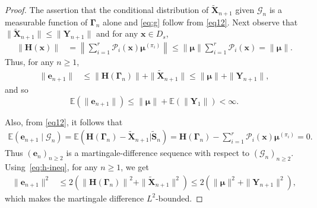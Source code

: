 \documentclass[10pt,a4paper]{amsart}
\begin{document}
\begin{proof} 
{%
The assertion that the conditional distribution of $\boldsymbol{\widetilde{X}}_{n+1}$ given $\mathcal{G}_{n}$ is a measurable function of $\boldsymbol{\Gamma}_{n}$ alone and \eqref{eq:g} follow from \eqref{eq12}. Next observe that $\|\boldsymbol{\widetilde{X}}_{n+1}\| \leq \|\boldsymbol{Y}_{n+1}\|$ and for any $\boldsymbol{x} \in {D}_s$,
\begin{align}\label{eq:h-ineq}
    \|\boldsymbol{H}(\boldsymbol{x})\| &= \left\|\sum_{i=1}^{r}\mathcal{P}_i(\boldsymbol{x})\boldsymbol{\mu}^{(\pi_i)}\right\| \leq \|\boldsymbol{\mu}\| \sum_{i=1}^{r} \mathcal{P}_i(\boldsymbol{x}) = \|\boldsymbol{\mu}\|. 
\end{align}
Thus, for any $n \geq 1$,
\begin{align}\label{eq:e-bound}
    \|\boldsymbol{e}_{n+1}\| &\leq \left\|\boldsymbol{H}\left({\boldsymbol{\Gamma}_n}\right)\right\| + \|\boldsymbol{\widetilde{X}}_{n+1}\| \leq \|\boldsymbol{\mu}\| + \|\boldsymbol{Y}_{n+1}\|,
\end{align}
and so
\[\mathbb{E}\left(\|\boldsymbol{e}_{n+1}\|\right) \leq \|\boldsymbol{\mu}\| +  \mathbb{E}\left(\|\boldsymbol{Y}_1\|\right)< \infty.\]}

Also, from 
\eqref{eq12}, it follows that 
\begin{align*}
    \mathbb{E}\left(\boldsymbol{e}_{n+1} \mid \mathcal{G}_{n}\right) = \mathbb{E}\left(\boldsymbol{H}({\boldsymbol{\Gamma}_n}) - \boldsymbol{\widetilde{X}}_{n+1} \Big| \boldsymbol{\widetilde{S}}_{n}\right) = \boldsymbol{H}({\boldsymbol{\Gamma}_n}) -  \sum_{i=1}^{r}\mathcal{P}_i(\boldsymbol{x})\boldsymbol{\mu}^{(\pi_i)} 
    = 0.
\end{align*}
Thus 
$\left(\boldsymbol{e}_{n}\right)_{n \geq 2}$ is a martingale-difference sequence with respect to $\left(\mathcal{G}_{n}\right)_{n \geq 2}$.
Using~\eqref{eq:h-ineq}, 
for any $n \geq 1$, we get
\begin{align}\label{eq:e-bound2}
    \|\boldsymbol{e}_{n+1}\|^2 &\leq 2\left(\left\|\boldsymbol{H}\left({\boldsymbol{\Gamma}_n}\right)\right\|^2 + \|\boldsymbol{\widetilde{X}}_{n+1}\|^2\right)
   \leq 2\left(\|\boldsymbol{\mu}\|^2 + \|\boldsymbol{Y}_{n+1}\|^2\right),
\end{align}
which makes the martingale difference $L^2$-bounded.


\end{proof}
\end{document}
